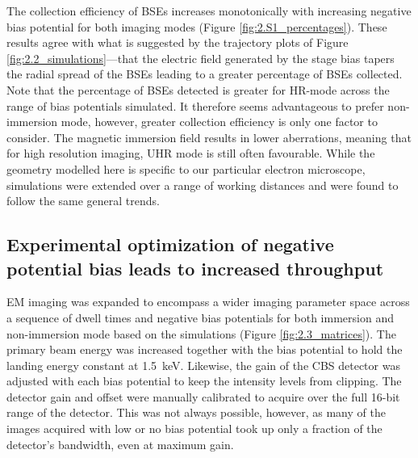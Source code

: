 The collection efficiency of BSEs increases monotonically with increasing negative bias potential for both imaging modes (Figure \ref{fig:2.S1_percentages}). These results agree with what is suggested by the trajectory plots of Figure \ref{fig:2.2_simulations}---that the electric field generated by the stage bias tapers the radial spread of the BSEs leading to a greater percentage of BSEs collected. Note that the percentage of BSEs detected is greater for HR-mode across the range of bias potentials simulated. It therefore seems advantageous to prefer non-immersion mode, however, greater collection efficiency is only one factor to consider. The magnetic immersion field results in lower aberrations, meaning that for high resolution imaging, UHR mode is still often favourable. While the geometry modelled here is specific to our particular electron microscope, simulations were extended over a range of working distances and were found to follow the same general trends.%


\subsection{Experimental optimization of negative potential bias leads to increased throughput}

EM imaging was expanded to encompass a wider imaging parameter space across a sequence of dwell times and negative bias potentials for both immersion and non-immersion mode based on the simulations (Figure \ref{fig:2.3_matrices}). The primary beam energy was increased together with the bias potential to hold the landing energy constant at \SI{1.5}{\kilo\electronvolt}. Likewise, the gain of the CBS detector was adjusted with each bias potential to keep the intensity levels from clipping. The detector gain and offset were manually calibrated to acquire over the full 16-bit range of the detector. This was not always possible, however, as many of the images acquired with low or no bias potential took up only a fraction of the detector's bandwidth, even at maximum gain.

